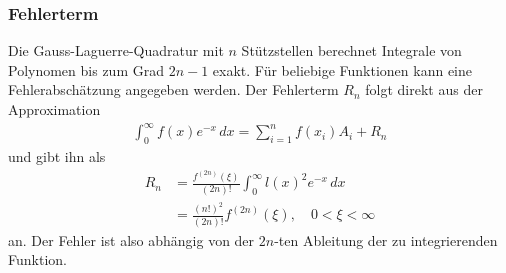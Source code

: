 \subsubsection{Fehlerterm}
Die Gauss-Laguerre-Quadratur mit $n$ Stützstellen berechnet Integrale
von Polynomen bis zum Grad $2n - 1$ exakt.
Für beliebige Funktionen kann eine Fehlerabschätzung angegeben werden.
Der Fehlerterm $R_n$ folgt direkt aus der Approximation
\begin{align*}
\int_0^{\infty} f(x) e^{-x} \, dx
=
\sum_{i=1}^n f(x_i) A_i + R_n
\end{align*}
und \cite{laguerre:abramowitz+stegun} gibt ihn als
\begin{align}
R_n
 & =
\frac{f^{(2n)}(\xi)}{(2n)!} \int_0^\infty l(x)^2 e^{-x}\,dx
\\
 & =
\frac{(n!)^2}{(2n)!} f^{(2n)}(\xi)
,\quad
0 < \xi < \infty
\label{laguerre:lag_error}
\end{align}
an.
Der Fehler ist also abhängig von der $2n$-ten Ableitung
der zu integrierenden Funktion.
